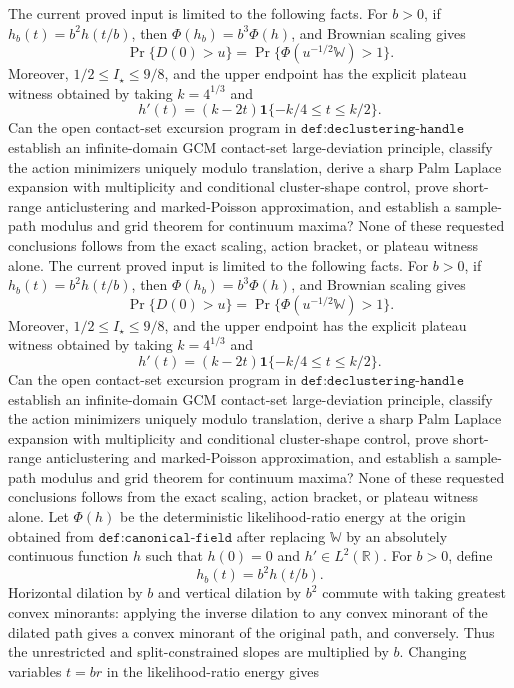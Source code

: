 The current proved input is limited to the following facts.  For \(b>0\), if \(h_b(t)=b^2h(t/b)\), then \(\Phi(h_b)=b^3\Phi(h)\), and Brownian scaling gives
\[
 \Pr\{D(0)>u\}=\Pr\{\Phi(u^{-1/2}\mathbb W)>1\}.
\]
Moreover, \(1/2\le I_\star\le9/8\), and the upper endpoint has the explicit plateau witness obtained by taking \(k=4^{1/3}\) and
\[
 h'(t)=(k-2t)\mathbf 1\{-k/4\le t\le k/2\}.
\]
Can the open contact-set excursion program in \(\texttt{def:declustering-handle}\) establish an infinite-domain GCM contact-set large-deviation principle, classify the action minimizers uniquely modulo translation, derive a sharp Palm Laplace expansion with multiplicity and conditional cluster-shape control, prove short-range anticlustering and marked-Poisson approximation, and establish a sample-path modulus and grid theorem for continuum maxima?  None of these requested conclusions follows from the exact scaling, action bracket, or plateau witness alone.
The current proved input is limited to the following facts.  For \(b>0\), if \(h_b(t)=b^2h(t/b)\), then \(\Phi(h_b)=b^3\Phi(h)\), and Brownian scaling gives
\[
 \Pr\{D(0)>u\}=\Pr\{\Phi(u^{-1/2}\mathbb W)>1\}.
\]
Moreover, \(1/2\le I_\star\le9/8\), and the upper endpoint has the explicit plateau witness obtained by taking \(k=4^{1/3}\) and
\[
 h'(t)=(k-2t)\mathbf 1\{-k/4\le t\le k/2\}.
\]
Can the open contact-set excursion program in \(\texttt{def:declustering-handle}\) establish an infinite-domain GCM contact-set large-deviation principle, classify the action minimizers uniquely modulo translation, derive a sharp Palm Laplace expansion with multiplicity and conditional cluster-shape control, prove short-range anticlustering and marked-Poisson approximation, and establish a sample-path modulus and grid theorem for continuum maxima?  None of these requested conclusions follows from the exact scaling, action bracket, or plateau witness alone.
Let \(\Phi(h)\) be the deterministic likelihood-ratio energy at the origin obtained from \(\texttt{def:canonical-field}\) after replacing \(\mathbb W\) by an absolutely continuous function \(h\) such that \(h(0)=0\) and \(h'\in L^2(\mathbb R)\).  For \(b>0\), define
\[
 h_b(t)=b^2h(t/b).
\]
Horizontal dilation by \(b\) and vertical dilation by \(b^2\) commute with taking greatest convex minorants: applying the inverse dilation to any convex minorant of the dilated path gives a convex minorant of the original path, and conversely.  Thus the unrestricted and split-constrained slopes are multiplied by \(b\).  Changing variables \(t=br\) in the likelihood-ratio energy gives
